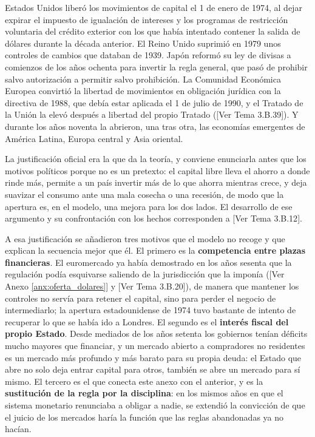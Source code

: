 \documentclass[10pt,a4paper]{article}
\newcommand{\authorfont}[1]{{\fontfamily{EBGaramond-TLF}\selectfont #1}}
\newcounter{anexo}
\begin{document}
Estados Unidos liberó los movimientos de capital el 1 de enero de 1974, al dejar expirar el impuesto de igualación de intereses y los programas de restricción voluntaria del crédito exterior con los que había intentado contener la salida de dólares durante la década anterior. El Reino Unido suprimió en 1979 unos controles de cambios que databan de 1939. Japón reformó su ley de divisas a comienzos de los años ochenta para invertir la regla general, que pasó de prohibir salvo autorización a permitir salvo prohibición. La Comunidad Económica Europea convirtió la libertad de movimientos en obligación jurídica con la directiva de 1988, que debía estar aplicada el 1 de julio de 1990, y el Tratado de la Unión la elevó después a libertad del propio Tratado ([\authorfont{Ver Tema 3.B.39}]). Y durante los años noventa la abrieron, una tras otra, las economías emergentes de América Latina, Europa central y Asia oriental.

La justificación oficial era la que da la teoría, y conviene enunciarla antes que los motivos políticos porque no es un pretexto: el capital libre lleva el ahorro a donde rinde más, permite a un país invertir más de lo que ahorra mientras crece, y deja suavizar el consumo ante una mala cosecha o una recesión, de modo que la apertura es, en el modelo, una mejora para los dos lados. El desarrollo de ese argumento y su confrontación con los hechos corresponden a [\authorfont{Ver Tema 3.B.12}].

A esa justificación se añadieron tres motivos que el modelo no recoge y que explican la secuencia mejor que él. El primero es la \textbf{competencia entre plazas financieras}. El euromercado ya había demostrado en los años sesenta que la regulación podía esquivarse saliendo de la jurisdicción que la imponía ([\authorfont{Ver Anexo \ref{anx:oferta_dolares}}] y [\authorfont{Ver Tema 3.B.20}]), de manera que mantener los controles no servía para retener el capital, sino para perder el negocio de intermediarlo; la apertura estadounidense de 1974 tuvo bastante de intento de recuperar lo que se había ido a Londres. El segundo es el \textbf{interés fiscal del propio Estado}. Desde mediados de los años setenta los gobiernos tenían déficits mucho mayores que financiar, y un mercado abierto a compradores no residentes es un mercado más profundo y más barato para su propia deuda: el Estado que abre no solo deja entrar capital para otros, también se abre un mercado para sí mismo. El tercero es el que conecta este anexo con el anterior, y es la \textbf{sustitución de la regla por la disciplina}: en los mismos años en que el sistema monetario renunciaba a obligar a nadie, se extendió la convicción de que el juicio de los mercados haría la función que las reglas abandonadas ya no hacían.
\end{document}
